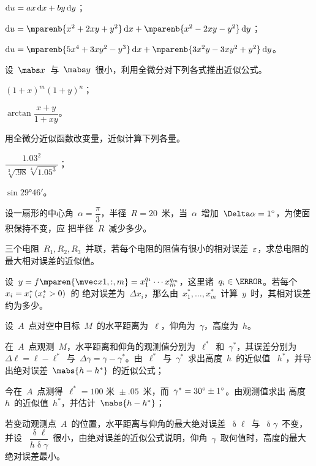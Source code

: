 \begin{exercise}
\begin{exlistcols}
  \item $\mathop{}\negthinspace\mathrm d u=ax\mathop{}\negthinspace\mathrm d x+by\mathop{}\negthinspace\mathrm d y$；
  \item $\dif u=\mparenb{x^2+2xy+y^2}\dif x+\mparenb{x^2-2xy-y^2}\dif y$；
  \item $\dif u=\mparenb{5x^4+3xy^2-y^3}\dif x+\mparenb{3x^2y-3xy^2+y^2}\dif y$。
\end{exlistcols}
\item 设~$\mabs x$~与~$\mabs y$~很小，利用全微分对下列各式推出近似公式。
\begin{exlistcols}
  \item $(1+x)^m(1+y)^n$；
  \item $\arctan\dfrac{x+y}{1+xy}$。
\end{exlistcols}
\item 用全微分近似函数改变量，近似计算下列各量。
\begin{exlistcols}
  \item $\dfrac{\num{1.03}^2}{\sqrt[3]{\num{.98}}\sqrt[4]{\num{1.05}^3}}$；
  \item $\sin\ang{29;46;}$。
\end{exlistcols}
\item 设一扇形的中心角~$\alpha=\dfrac\pi3$，半径~$R=20$~米，当~$\alpha$~增加~$\Delta\alpha=\ang 1$，为使面积保持不变，应
把半径~$R$~减少多少。
\item 三个电阻~$R_1,R_2,R_3$~并联，若每个电阻的阻值有很小的相对误差~$\varepsilon$，求总电阻的最大相对误差的近似值。
\item 设~$y=f\mparen{\mvec x{1,:,m}}=x_1^{q_1}\dotsm x_m^{q_m}$，这里诸~$q_i\in\mN$。若每个~$x_i=x_i^\ast\mcond{x_i^\ast>0}$~的
绝对误差为~$\Delta x_i$，那么由~$x_1^\ast,\dotsc,x_m^\ast$~计算~$y$~时，其相对误差约为多少。
\item 设~$A$~点对空中目标~$M$~的水平距离为~$\ell$，仰角为~$\gamma$，高度为~$h$。
\begin{exlist}
  \item 在~$A$~点观测~$M$，水平距离和仰角的观测值分别为~$\ell^\ast$~和~$\gamma^\ast$，其误差分别为
  ~$\Delta\ell=\ell-\ell^\ast$~与~$\Delta\gamma=\gamma-\gamma^\ast$。由~$\ell^\ast$~与~$\gamma^\ast$~求出高度~$h$~的近似值
  ~$h^\ast$，并导出绝对误差~$\mabs{h-h^\ast}$~的近似公式；
  \item 今在~$A$~点测得~$\ell^\ast=\num{100}\text{~米~}\pm\num{.05}$~米，而~$\gamma^\ast=\ang{30}\pm\ang 1$。由观测值求出
  高度~$h$~的近似值~$h^\ast$，并估计~$\mabs{h-h^\ast}$；
  \item 若变动观测点~$A$~的位置，水平距离与仰角的最大绝对误差~$\updelta\ell$~与~$\updelta\gamma$~不变，并设
  ~$\dfrac{\updelta\ell}{h\updelta\gamma}$~很小，由绝对误差的近似公式说明，仰角~$\gamma$~取何值时，高度的最大绝对误差最小。
\end{exlist}
\end{exercise}

